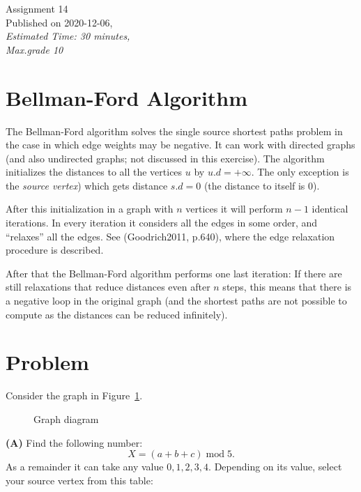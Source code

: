 \documentclass[a4paper,12pt]{article}
\begin{document}
\twocolumn

\thispagestyle{empty}

\begin{center}
{\Large Assignment 14}\\
{\Large Published on 2020-12-06,}\\
{\em Estimated Time: 30 minutes,}\\
{\em Max.grade 10\textperthousand} 
\end{center}


\section{Bellman-Ford Algorithm}

The Bellman-Ford algorithm solves the single source shortest paths problem in
the case in which edge weights may be negative. It can work with directed graphs
(and also undirected graphs; not discussed in this exercise).  
The algorithm initializes the distances to all the vertices $u$ by $u.d = +\infty$. 
The only exception is the {\em source vertex}) which 
gets distance $s.d = 0$ (the distance to itself is $0$). 

After this initialization 
in a graph with $n$ vertices it will perform $n-1$ identical iterations. 
In every iteration it considers all the edges in some order, 
and ``relaxes'' all the edges. See (Goodrich2011, p.640), where
the edge relaxation procedure is described. 

After that the Bellman-Ford algorithm performs one last iteration: 
If there are still relaxations that reduce distances even after $n$ steps, 
this means that there is a negative loop in the original graph 
(and the shortest paths are not possible to compute as the distances can 
be reduced infinitely). 



\section{Problem}

Consider the graph in Figure~\ref{fig:problem-graph}.

\begin{figure}[!htb]
\caption{\label{fig:problem-graph} Graph diagram}
\end{figure}

\vspace{10pt}
{\bf (A)} Find the following number: 
$$X = (a+b+c)\;\text{mod}\;5.$$
As a remainder it can take any value $0,1,2,3,4$. 
Depending on its value, select your source vertex 
from this table: 
\end{document}
